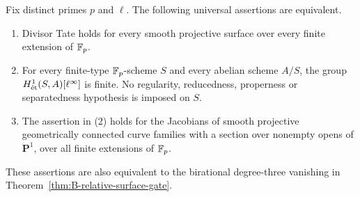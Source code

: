 \begin{theorem}
\label{thm:B-all-bases-surface-gate}
Fix distinct primes \(p\) and \(\ell\).  The following
universal assertions are equivalent.
\begin{enumerate}
\item Divisor Tate holds for every smooth projective surface
over every finite extension of \(\mathbb F_p\).
\item For every finite-type \(\mathbb F_p\)-scheme \(S\) and
every abelian scheme \(A/S\), the group
\(H^1_{\mathrm{\acute et}}(S,A)[\ell^\infty]\) is finite.  No
regularity, reducedness, properness or separatedness hypothesis
is imposed on \(S\).
\item The assertion in (2) holds for the Jacobians of smooth
projective geometrically connected curve families with a section
over nonempty opens of \(\mathbf P^1\), over all finite
extensions of \(\mathbb F_p\).
\end{enumerate}
These assertions are also equivalent to the birational
degree-three vanishing in
Theorem~\ref{thm:B-relative-surface-gate}.
\end{theorem}
